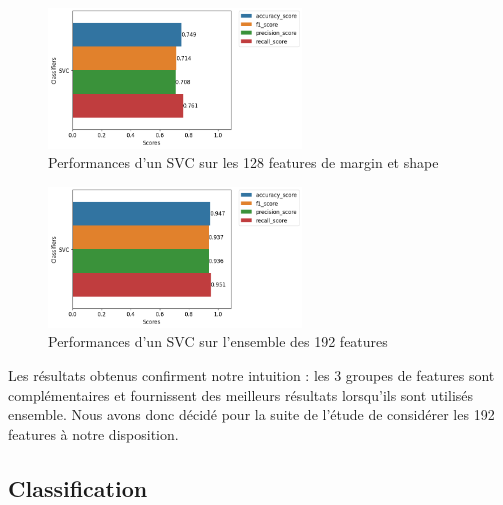 \documentclass{article}
\begin{document}
\begin{figure}[h]
    \centering
    \includegraphics[width=0.6\textwidth]{img/svc_perfs_without_texture.png}
    \caption{Performances d'un SVC sur les 128 features de margin et shape}
\end{figure}

\begin{figure}[h]
    \centering
    \includegraphics[width=0.6\textwidth]{img/svc_perfs_all_data.png}
    \caption{Performances d'un SVC sur l'ensemble des 192 features}
\end{figure}

\newpage
Les résultats obtenus confirment notre intuition : les 3 groupes de features sont complémentaires
et fournissent des meilleurs résultats lorsqu'ils sont utilisés ensemble. Nous avons donc
décidé pour la suite de l'étude de considérer les 192 features à notre disposition.

\subsection{Classification}
\end{document}
